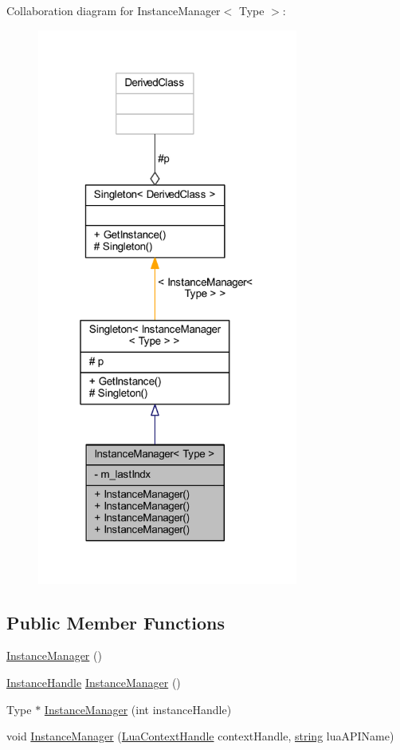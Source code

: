 Collaboration diagram for Instance\+Manager$<$ Type $>$\+:\nopagebreak
\begin{figure}[H]
\begin{center}
\leavevmode
\includegraphics[width=243pt]{class_instance_manager__coll__graph}
\end{center}
\end{figure}
\subsection*{Public Member Functions}
\begin{DoxyCompactItemize}
\item 
\hyperlink{class_instance_manager_ab3980fd66aa58b578f717153ead48cff}{Instance\+Manager} ()
\item 
\hyperlink{_lua_object_instance_manager_8h_a317edebd09c13058779c942342947a0d}{Instance\+Handle} \hyperlink{class_instance_manager_aae464dea5086936eab94526a249bd658}{Instance\+Manager} ()
\item 
Type $\ast$ \hyperlink{class_instance_manager_a0db6720e777da4a044c071eb4127495f}{Instance\+Manager} (int instance\+Handle)
\item 
void \hyperlink{class_instance_manager_ab3308701202e2b9ce924e940fd29cc8e}{Instance\+Manager} (\hyperlink{_lua_context_8h_a2ffcc2d3ed21165072a1d7b61259bf14}{Lua\+Context\+Handle} context\+Handle, \hyperlink{_types_8h_ad453f9f71ce1f9153fb748d6bb25e454}{string} lua\+A\+P\+I\+Name)
\end{DoxyCompactItemize}
